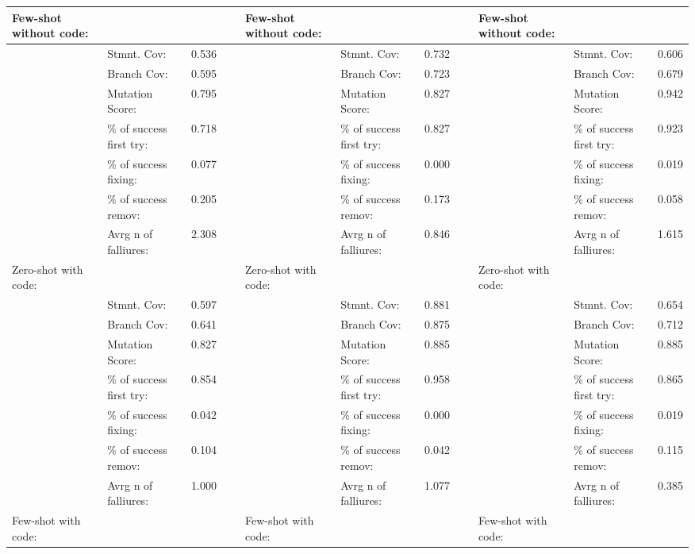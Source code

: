 \documentclass[a4paper,11pt,oneside]{memoir}
\begin{document}
\begin{table}[!ht]
{\begin{tabular}{|l|l|l|l|l|l|l|l|l|l|l|}
        Few-shot without code: & ~ & ~ & ~ & Few-shot without code: & ~ & ~ & ~ & Few-shot without code: & ~ & ~ \\ \hline
        ~ & Stmnt. Cov: & 0.536 & ~ & ~ & Stmnt. Cov: & 0.732 & ~ & ~ & Stmnt. Cov: & 0.606 \\ \hline
        ~ & Branch Cov: & 0.595 & ~ & ~ & Branch Cov: & 0.723 & ~ & ~ & Branch Cov: & 0.679 \\ \hline
        ~ & Mutation Score: & 0.795 & ~ & ~ & Mutation Score: & 0.827 & ~ & ~ & Mutation Score: & 0.942 \\ \hline
        ~ & \% of success first try: & 0.718 & ~ & ~ & \% of success first try: & 0.827 & ~ & ~ & \% of success first try: & 0.923 \\ \hline
        ~ & \% of success fixing: & 0.077 & ~ & ~ & \% of success fixing: & 0.000 & ~ & ~ & \% of success fixing: & 0.019 \\ \hline
        ~ & \% of success remov: & 0.205 & ~ & ~ & \% of success remov: & 0.173 & ~ & ~ & \% of success remov: & 0.058 \\ \hline
        ~ & Avrg n of falliures: & 2.308 & ~ & ~ & Avrg n of falliures: & 0.846 & ~ & ~ & Avrg n of falliures: & 1.615 \\ \hline
        Zero-shot with code: & ~ & ~ & ~ & Zero-shot with code: & ~ & ~ & ~ & Zero-shot with code: & ~ & ~ \\ \hline
        ~ & Stmnt. Cov: & 0.597 & ~ & ~ & Stmnt. Cov: & 0.881 & ~ & ~ & Stmnt. Cov: & 0.654 \\ \hline
        ~ & Branch Cov: & 0.641 & ~ & ~ & Branch Cov: & 0.875 & ~ & ~ & Branch Cov: & 0.712 \\ \hline
        ~ & Mutation Score: & 0.827 & ~ & ~ & Mutation Score: & 0.885 & ~ & ~ & Mutation Score: & 0.885 \\ \hline
        ~ & \% of success first try: & 0.854 & ~ & ~ & \% of success first try: & 0.958 & ~ & ~ & \% of success first try: & 0.865 \\ \hline
        ~ & \% of success fixing: & 0.042 & ~ & ~ & \% of success fixing: & 0.000 & ~ & ~ & \% of success fixing: & 0.019 \\ \hline
        ~ & \% of success remov: & 0.104 & ~ & ~ & \% of success remov: & 0.042 & ~ & ~ & \% of success remov: & 0.115 \\ \hline
        ~ & Avrg n of falliures: & 1.000 & ~ & ~ & Avrg n of falliures: & 1.077 & ~ & ~ & Avrg n of falliures: & 0.385 \\ \hline
        Few-shot with code: & ~ & ~ & ~ & Few-shot with code: & ~ & ~ & ~ & Few-shot with code: & ~ & ~ \\ \hline

\end{tabular}}
\end{table}
\end{document}
